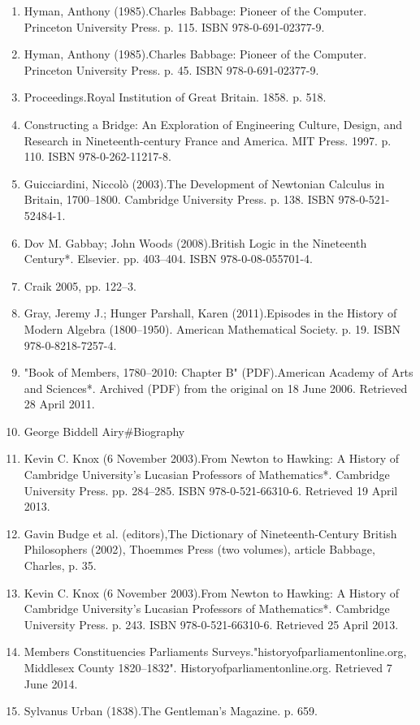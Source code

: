\begin{enumerate}
\item Hyman, Anthony (1985).Charles Babbage: Pioneer of the Computer. Princeton University Press. p. 115. ISBN 978-0-691-02377-9.
\item Hyman, Anthony (1985).Charles Babbage: Pioneer of the Computer. Princeton University Press. p. 45. ISBN 978-0-691-02377-9.
\item Proceedings.Royal Institution of Great Britain. 1858. p. 518.
\item Constructing a Bridge: An Exploration of Engineering Culture, Design, and Research in Nineteenth-century France and America. MIT Press. 1997. p. 110. ISBN 978-0-262-11217-8.
\item Guicciardini, Niccolò (2003).The Development of Newtonian Calculus in Britain, 1700–1800. Cambridge University Press. p. 138. ISBN 978-0-521-52484-1.
\item Dov M. Gabbay; John Woods (2008).British Logic in the Nineteenth Century*. Elsevier. pp. 403–404. ISBN 978-0-08-055701-4.
\item Craik 2005, pp. 122–3.
\item Gray, Jeremy J.; Hunger Parshall, Karen (2011).Episodes in the History of Modern Algebra (1800–1950). American Mathematical Society. p. 19. ISBN 978-0-8218-7257-4.
\item "Book of Members, 1780–2010: Chapter B" (PDF).American Academy of Arts and Sciences*. Archived (PDF) from the original on 18 June 2006. Retrieved 28 April 2011.
\item George Biddell Airy#Biography
\item Kevin C. Knox (6 November 2003).From Newton to Hawking: A History of Cambridge University's Lucasian Professors of Mathematics*. Cambridge University Press. pp. 284–285. ISBN 978-0-521-66310-6. Retrieved 19 April 2013.
\item Gavin Budge et al. (editors),The Dictionary of Nineteenth-Century British Philosophers (2002), Thoemmes Press (two volumes), article Babbage, Charles, p. 35.
\item Kevin C. Knox (6 November 2003).From Newton to Hawking: A History of Cambridge University's Lucasian Professors of Mathematics*. Cambridge University Press. p. 243. ISBN 978-0-521-66310-6. Retrieved 25 April 2013.
\item Members Constituencies Parliaments Surveys."historyofparliamentonline.org, Middlesex County 1820–1832". Historyofparliamentonline.org. Retrieved 7 June 2014.
\item Sylvanus Urban (1838).The Gentleman's Magazine. p. 659.

\end{enumerate}
